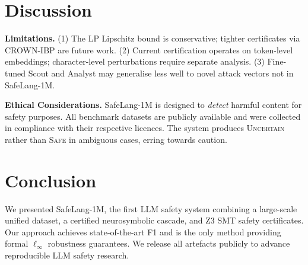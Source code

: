 \documentclass[conference]{IEEEtran}
\begin{document}
\section{Discussion}
\label{sec:discussion}

\noindent\textbf{Limitations.}
(1) The LP Lipschitz bound is conservative; tighter certificates via
CROWN-IBP \cite{zhang2018efficient} are future work.
(2) Current certification operates on token-level embeddings;
character-level perturbations require separate analysis.
(3) Fine-tuned Scout and Analyst may generalise less well to novel attack
vectors not in SafeLang-1M.

\noindent\textbf{Ethical Considerations.}
SafeLang-1M is designed to \emph{detect} harmful content for safety purposes.
All benchmark datasets are publicly available and were collected in compliance
with their respective licences. The system produces \textsc{Uncertain} rather
than \textsc{Safe} in ambiguous cases, erring towards caution.

\section{Conclusion}
\label{sec:conclusion}

We presented SafeLang-1M, the first LLM safety system combining a large-scale
unified dataset, a certified neurosymbolic cascade, and Z3 SMT safety
certificates. Our approach achieves state-of-the-art F1 and is the only method
providing formal $\ell_\infty$ robustness guarantees. We release all artefacts
publicly to advance reproducible LLM safety research.



\end{document}
